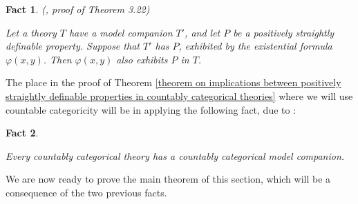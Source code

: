 \documentclass[10pt,a4paper]{amsart}
\newtheorem{fact}{Fact}
\begin{document}
\begin{fact}\label{preservation under model companions}
(\cite{bodirsky2025taking}, proof of Theorem 3.22)

Let a theory $T$ have a model companion $T'$, and let $P$ be a positively straightly definable property. Suppose that $T'$ has $P$, exhibited by the \emph{existential} formula $\varphi(x, y)$. Then $\varphi(x, y)$ also exhibits $P$ in $T$.
\end{fact}


The place in the proof of Theorem \ref{theorem on implications between positively straightly definable properties in countably categorical theories} where we will use countable categoricity will be in applying the following fact, due to \cite{saracino1973model}:

\begin{fact}\label{countably categorical theories have model companions}

Every countably categorical theory has a countably categorical model companion.

\end{fact}

We are now ready to prove the main theorem of this section, which will be a consequence of the two previous facts.
\end{document}
